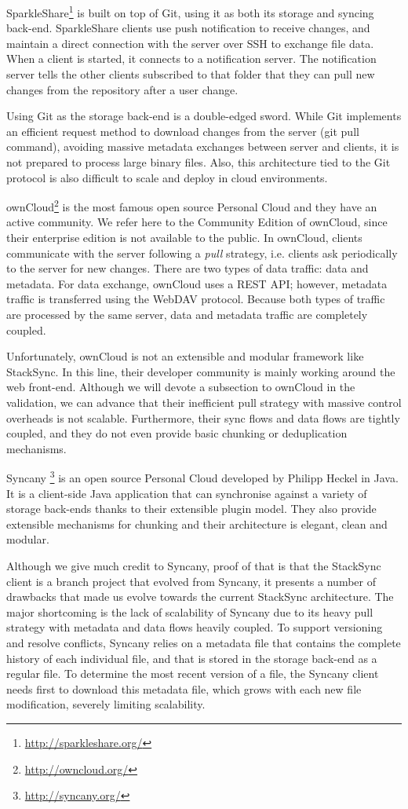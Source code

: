 SparkleShare\footnote{\url{http://sparkleshare.org/}} is built on top of Git, using it 
as both its storage and syncing back-end. SparkleShare clients use push notification
to receive changes, and maintain a direct connection with the server over SSH to exchange file data.
When a client is started, it connects to a notification server. The notification server tells the other
clients subscribed to that folder that they can pull new changes from the repository after a user
change. 

Using Git as the storage back-end is a double-edged sword. While Git implements an efficient request
method to download changes from the server (git pull command), avoiding massive metadata exchanges
between server and clients, it is not prepared to process large binary files. Also, this architecture
tied to the Git protocol is also difficult to scale and deploy in cloud environments.

ownCloud\footnote{\url{http://owncloud.org/}} is the most famous open source  Personal Cloud 
and they have an active community. We refer here to the Community Edition of ownCloud, since their enterprise edition is not available to the public. In ownCloud, clients communicate with the server following a \textit{pull} strategy, i.e. clients ask periodically to the server for new changes. There are two types of data traffic: data and metadata. For data exchange, ownCloud uses a REST API; however, metadata traffic is transferred using the WebDAV protocol. 
Because both types of traffic are processed by the same server, data and metadata traffic are completely coupled.

Unfortunately, ownCloud is not an extensible and modular framework like StackSync. In this line, their developer community is mainly working around the web front-end. Although we will devote a subsection to ownCloud in the validation, we can advance that their inefficient pull strategy with massive control overheads is not scalable. Furthermore, their sync flows and data flows are tightly coupled, and they do not even provide basic chunking or deduplication mechanisms. 

Syncany \footnote{\url{http://syncany.org/}} is an open source Personal Cloud developed by Philipp Heckel in Java. It is a client-side Java application that can synchronise against a variety of storage back-ends thanks to their extensible plugin model. They also provide extensible mechanisms for chunking and their architecture is elegant, clean and modular.

Although we give much credit to Syncany, proof of that is that the StackSync client is a branch project that evolved 
from Syncany, it presents a number of drawbacks that made us evolve towards the current StackSync architecture. 
The major shortcoming is the lack of scalability of Syncany due to its heavy pull strategy with metadata and
data flows heavily coupled. To support versioning and resolve conflicts, Syncany relies on a metadata file 
that contains the complete history of each individual file, and that is stored in the storage back-end
as a regular file. To determine the most recent version of a file, the Syncany client needs first to
download this metadata file, which grows with each new file modification, severely limiting scalability.


